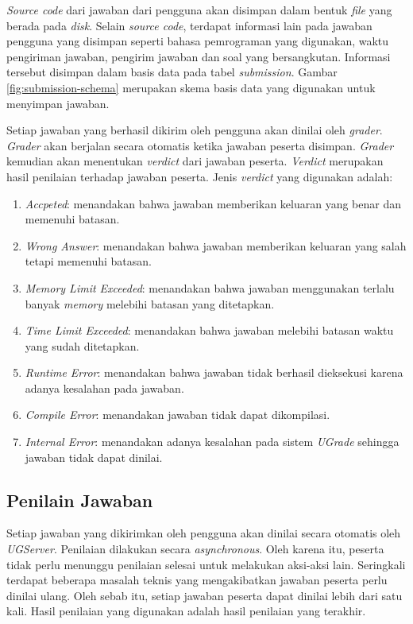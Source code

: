 \par \textit{Source code} dari jawaban dari pengguna akan disimpan dalam bentuk \textit{file} yang berada pada \textit{disk}. Selain \textit{source code}, terdapat informasi lain pada jawaban pengguna yang disimpan seperti bahasa pemrograman yang digunakan, waktu pengiriman jawaban, pengirim jawaban dan soal yang bersangkutan. Informasi tersebut disimpan dalam basis data pada tabel \textit{submission}. Gambar \ref{fig:submission-schema} merupakan skema basis data yang digunakan untuk menyimpan jawaban.

\par Setiap jawaban yang berhasil dikirim oleh pengguna akan dinilai oleh \textit{grader}. \textit{Grader} akan berjalan secara otomatis ketika jawaban peserta disimpan. \textit{Grader} kemudian akan menentukan \textit{verdict} dari jawaban peserta. \textit{Verdict} merupakan hasil penilaian terhadap jawaban peserta. Jenis \textit{verdict} yang digunakan adalah:
\begin{enumerate}
    \item \textit{Accpeted}: menandakan bahwa jawaban memberikan keluaran yang benar dan memenuhi batasan.
    \item \textit{Wrong Answer}: menandakan bahwa jawaban memberikan keluaran yang salah tetapi memenuhi batasan.
    \item \textit{Memory Limit Exceeded}: menandakan bahwa jawaban menggunakan terlalu banyak \textit{memory} melebihi batasan yang ditetapkan.
    \item \textit{Time Limit Exceeded}: menandakan bahwa jawaban melebihi batasan waktu yang sudah ditetapkan.
    \item \textit{Runtime Error}: menandakan bahwa jawaban tidak berhasil dieksekusi karena adanya kesalahan pada jawaban.
    \item \textit{Compile Error}: menandakan jawaban tidak dapat dikompilasi.
    \item \textit{Internal Error}: menandakan adanya kesalahan pada sistem \textit{UGrade} sehingga jawaban tidak dapat dinilai.
\end{enumerate}

\subsection{Penilain Jawaban}

\par Setiap jawaban yang dikirimkan oleh pengguna akan dinilai secara otomatis oleh \textit{UGServer}. Penilaian dilakukan secara \textit{asynchronous}. Oleh karena itu, peserta tidak perlu menunggu penilaian selesai untuk melakukan aksi-aksi lain. Seringkali terdapat beberapa masalah teknis yang mengakibatkan jawaban peserta perlu dinilai ulang. Oleh sebab itu, setiap jawaban peserta dapat dinilai lebih dari satu kali. Hasil penilaian yang digunakan adalah hasil penilaian yang terakhir.

